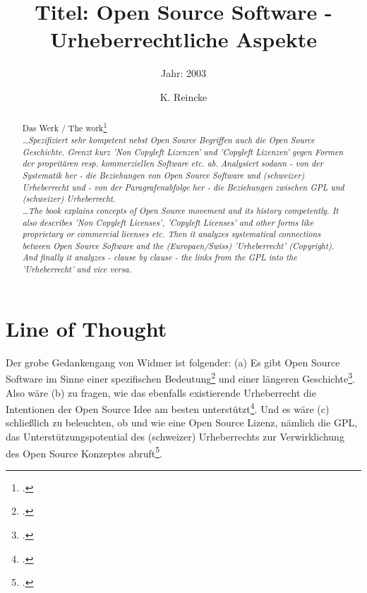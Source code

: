 \documentclass[DIV=calc,BCOR=5mm,11pt,headings=small,oneside,abstract=true, toc=bib]{scrartcl}
\begin{document}

\titlehead{Literaturexzerpt}
\subject{Autor(en): Mike J. Widmer}
\title{Titel: Open Source Software - Urheberrechtliche Aspekte}
\subtitle{Jahr: 2003 }
\author{K. Reincke}

\maketitle

\begin{abstract}
\noindent
Das Werk / The work\footcite[][]{Widmer2003a} \\
\noindent \itshape
\ldots Spezifiziert sehr kompetent nebst Open Source Begriffen auch die Open
Source Geschichte. Grenzt kurz 'Non Copyleft Lizenzen' und 'Copyleft Lizenzen'
gegen Formen der propritären resp. kommerziellen Software etc. ab. Analysiert
sodann - von der Systematik her - die Beziehungen von Open Source Software und
(schweizer) Urheberrecht und - von der Paragrafenabfolge her - die Beziehungen
zwischen GPL und (schweizer) Urheberrecht.\\
\noindent
\ldots The book explains concepts of Open Source movement and its history
competently. It also describes 'Non Copyleft Licenses', 'Copyleft Licenses' and
other forms like proprietary or commercial licenses etc. Then it analyzes
systematical connections between Open Source Software and the (Europaen/Swiss)
'Urheberrecht' (Copyright). And finally it analyzes - clause by clause - the
links from the GPL into the 'Urheberrecht' and vice versa.
\end{abstract}

\footnotesize
\tableofcontents
\normalsize

\section{Line of Thought}

Der grobe Gedankengang von Widmer ist folgender: (a) Es gibt \glqq{}Open
Source Software\grqq{} im Sinne einer spezifischen
Bedeutung\footcite[vgl.][21ff]{Widmer2003a} und einer längeren
Geschichte\footcite[vgl.][8ff]{Widmer2003a}. Also wäre (b) zu fragen, wie das
ebenfalls existierende Urheberrecht die Intentionen der Open Source Idee am
besten unterstützt\footcite[vgl.][47ff]{Widmer2003a}. Und es wäre (c)
schließlich zu beleuchten, ob und wie eine Open Source Lizenz, nämlich die GPL,
das Unterstützungspotential des (schweizer) Urheberrechts zur Verwirklichung des
Open Source Konzeptes abruft\footcite[vgl.][102ff]{Widmer2003a}.
\end{document}
